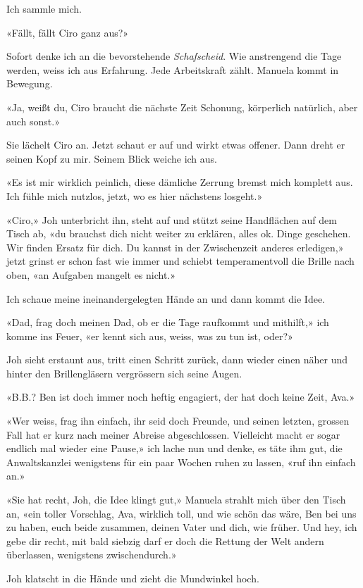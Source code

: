 Ich sammle mich.

«Fällt, fällt Ciro ganz aus?»

Sofort denke ich an die bevorstehende \emph{Schafscheid}. Wie
anstrengend die Tage werden, weiss ich aus Erfahrung. Jede Arbeitskraft
zählt. Manuela kommt in Bewegung.

«Ja, weißt du, Ciro braucht die nächste Zeit Schonung, körperlich
natürlich, aber auch sonst.»

Sie lächelt Ciro an. Jetzt schaut er auf und wirkt etwas offener. Dann
dreht er seinen Kopf zu mir. Seinem Blick weiche ich aus.

«Es ist mir wirklich peinlich, diese dämliche Zerrung bremst mich
komplett aus. Ich fühle mich nutzlos, jetzt, wo es hier nächstens
losgeht.»

«Ciro,» Joh unterbricht ihn, steht auf und stützt seine Handflächen auf
dem Tisch ab, «du brauchst dich nicht weiter zu erklären, alles ok.
Dinge geschehen. Wir finden Ersatz für dich. Du kannst in der
Zwischenzeit anderes erledigen,» jetzt grinst er schon fast wie immer
und schiebt temperamentvoll die Brille nach oben, «an Aufgaben mangelt
es nicht.»

Ich schaue meine ineinandergelegten Hände an und dann kommt die Idee.

«Dad, frag doch meinen Dad, ob er die Tage raufkommt und mithilft,» ich
komme ins Feuer, «er kennt sich aus, weiss, was zu tun ist, oder?»

Joh sieht erstaunt aus, tritt einen Schritt zurück, dann wieder einen
näher und hinter den Brillengläsern vergrössern sich seine Augen.

«B.B.? Ben ist doch immer noch heftig engagiert, der hat doch keine
Zeit, Ava.»

«Wer weiss, frag ihn einfach, ihr seid doch Freunde, und seinen letzten,
grossen Fall hat er kurz nach meiner Abreise abgeschlossen. Vielleicht
macht er sogar endlich mal wieder eine Pause,» ich lache nun und denke,
es täte ihm gut, die Anwaltskanzlei wenigstens für ein paar Wochen ruhen
zu lassen, «ruf ihn einfach an.»

«Sie hat recht, Joh, die Idee klingt gut,» Manuela strahlt mich über den
Tisch an, «ein toller Vorschlag, Ava, wirklich toll, und wie schön das
wäre, Ben bei uns zu haben, euch beide zusammen, deinen Vater und dich,
wie früher. Und hey, ich gebe dir recht, mit bald siebzig darf er doch
die Rettung der Welt andern überlassen, wenigstens zwischendurch.»

Joh klatscht in die Hände und zieht die Mundwinkel hoch.

